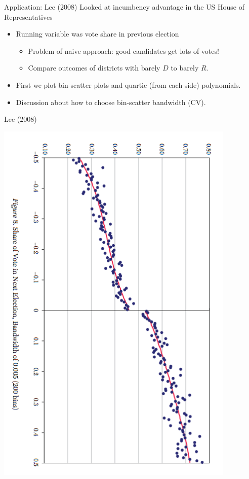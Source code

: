 \documentclass[xcolor=pdftex,dvipsnames,table,mathserif,aspectratio=169]{beamer}
\begin{document}
\begin{frame}{Application: Lee (2008)}
Looked at incumbency advantage in the US House of Representatives
\begin{itemize}
\item Running variable was vote share in previous election
\begin{itemize}
\item Problem of naive approach: good candidates get lots of votes!
\item Compare outcomes of districts with barely $D$ to barely $R$.
\end{itemize}
\item First we plot bin-scatter plots and quartic (from each side) polynomials.
\item Discussion about how to choose bin-scatter bandwidth (CV).
\end{itemize}
\end{frame}

\begin{frame}{Lee (2008)}
\begin{center}
\includegraphics[width=4.5in]{./resources/binscatter1}
\end{center}
\end{frame}
\end{document}
